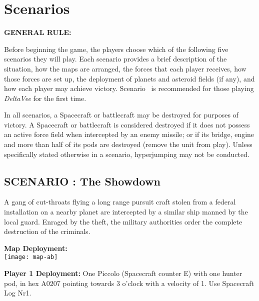 \begin{figure}[htbp]
  \centering
\end{figure}


\section{Scenarios}
\label{sec:scenarios}

\noindent\textbf{GENERAL RULE:}

Before beginning the game, the players choose which of the following
five scenarios they will play. Each scenario provides a brief
description of the situation, how the maps are arranged, the forces
that each player receives, how those forces are set up, the deployment
of planets and asteroid fields (if any), and how each player may
achieve victory. Scenario \thescenario\ is recommended for those
playing \emph{DeltaVee} for the first time.

In all scenarios, a Spacecraft or battlecraft may be destroyed for
purposes of victory. A Spacecraft or battlecraft is considered
destroyed if it does not possess an active force field when
intercepted by an enemy missile; or if its bridge, engine and more
than half of its pods are destroyed (remove the unit from play).
Unless specifically stated otherwise in a scenario, hyperjumping may
not be conducted.

\subsection*{SCENARIO \thescenario: The Showdown}
\label{sec:scenario-1:-showdown}



A gang of cut-throats flying a long range pursuit craft stolen from a
federal installation on a nearby planet are intercepted by a similar
ship manned by the local guard. Enraged by the theft, the military
authorities order the complete destruction of the criminals.

\textbf{Map Deployment:}\\
\texttt{[image: map-ab]}

\textbf{Player 1 Deployment:} One Piccolo (Spacecraft counter E) with
one hunter pod, in hex A0207 pointing towards 3 o'clock with a
velocity of 1. Use Spacecraft Log Nr1.

